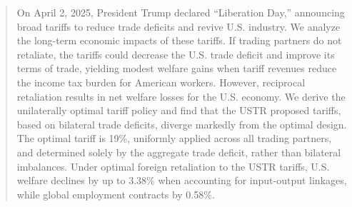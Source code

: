 \documentclass[12pt]{article}
\begin{document}
\begin{abstract}
\noindent On April 2, 2025, President Trump declared ``Liberation Day,'' announcing broad tariffs to reduce trade deficits and revive U.S. industry. We analyze the long-term economic impacts of these tariffs. If trading partners do not retaliate, the tariffs could decrease the U.S. trade deficit and improve its terms of trade, yielding modest welfare gains when tariff revenues reduce the income tax burden for American workers. However, reciprocal retaliation results in net welfare losses for the U.S. economy. We derive the unilaterally optimal tariff policy and find that the USTR proposed tariffs, based on bilateral trade deficits, diverge markedly from the optimal design. The optimal tariff is 19\%, uniformly applied across all trading partners, and determined solely by the aggregate trade deficit, rather than bilateral imbalances. Under optimal foreign retaliation to the USTR tariffs, U.S. welfare declines by up to 3.38\% when accounting for input-output linkages, while global employment contracts by 0.58\%.



\end{abstract}
\end{document}

